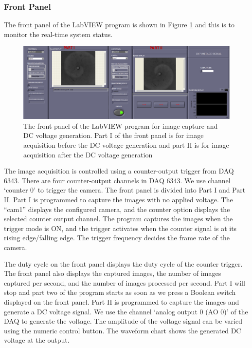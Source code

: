 \documentclass[journal=jacsat,manuscript=article]{achemso}
\begin{document}
\subsubsection{Front Panel}
The front panel of the LabVIEW program is shown in Figure \ref{fig:ex3} and this is to monitor the real-time system status. 
\begin{figure}[H]
    \centering
\includegraphics[width=\linewidth,height=0.6\linewidth]{Dc_frntpnl - Copy.png}
    \caption{The front panel of the LabVIEW program for image capture and DC voltage generation. Part I of the front panel is for image acquisition before the DC voltage generation and part II is for image acquisition after the DC voltage generation}
    \label{fig:ex3}
\end{figure}
The image acquisition is controlled using a counter-output trigger from DAQ 6343. There are four counter-output channels in DAQ 6343. We use channel ‘counter 0’ to trigger the camera. The front panel is divided into Part I and Part II. Part I is programmed to capture the images with no applied voltage. The “cam1” displays the configured camera, and the counter option displays the selected counter output channel. The program captures the images when the trigger mode is ON, and the trigger activates when the counter signal is at its rising edge/falling edge. The trigger frequency decides the frame rate of the camera. 

The duty cycle on the front panel displays the duty cycle of the counter trigger. The front panel also displays the captured images, the number of images captured per second, and the number of images processed per second. Part I will stop and part two of the program starts as soon as we press a Boolean switch displayed on the front panel. Part II is programmed to capture the images and generate a DC voltage signal. We use the channel ‘analog output 0 (AO 0)’ of the DAQ to generate the voltage. The amplitude of the voltage signal can be varied using the numeric control button. The waveform chart shows the generated DC voltage at the output. 
\end{document}
